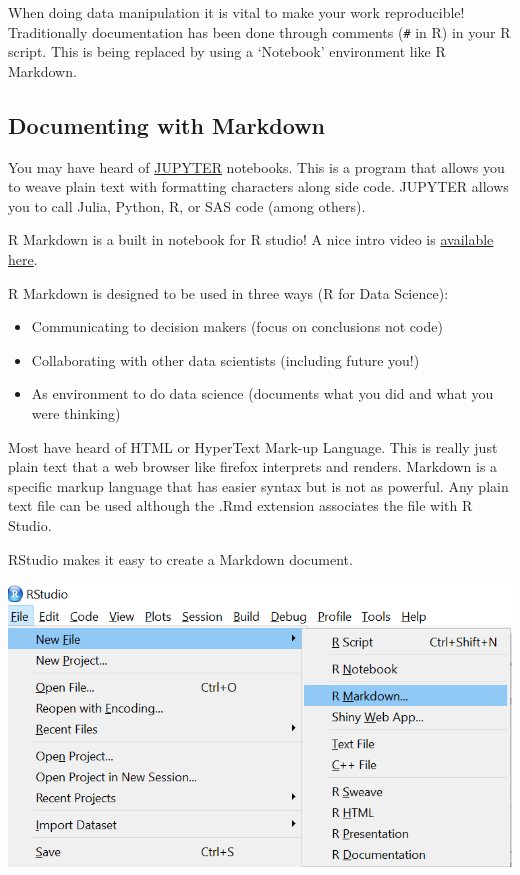 \documentclass[
]{book}
\theoremstyle{definition}
\theoremstyle{definition}
\theoremstyle{definition}
\theoremstyle{remark}
\begin{document}
When doing data manipulation it is vital to make your work reproducible! Traditionally documentation has been done through comments (\texttt{\#} in R) in your R script. This is being replaced by using a `Notebook' environment like R Markdown.

\hypertarget{documenting-with-markdown-1}{%
\subsection{Documenting with Markdown}\label{documenting-with-markdown-1}}

You may have heard of \href{http://jupyter.org/}{JUPYTER} notebooks. This is a program that allows you to weave plain text with formatting characters along side code. JUPYTER allows you to call Julia, Python, R, or SAS code (among others).

R Markdown is a built in notebook for R studio! A nice intro video is \href{https://vimeo.com/178485416}{available here}.

R Markdown is designed to be used in three ways (R for Data Science):

\begin{itemize}
\item
  Communicating to decision makers (focus on conclusions not code)
\item
  Collaborating with other data scientists (including future you!)
\item
  As environment to do data science (documents what you did and what you were thinking)
\end{itemize}

Most have heard of HTML or HyperText Mark-up Language. This is really just plain text that a web browser like firefox interprets and renders. Markdown is a specific markup language that has easier syntax but is not as powerful. Any plain text file can be used although the .Rmd extension associates the file with R Studio.

RStudio makes it easy to create a Markdown document.

\begin{center}\includegraphics[width=0.75\linewidth]{img/startMD} \end{center}
\end{document}
